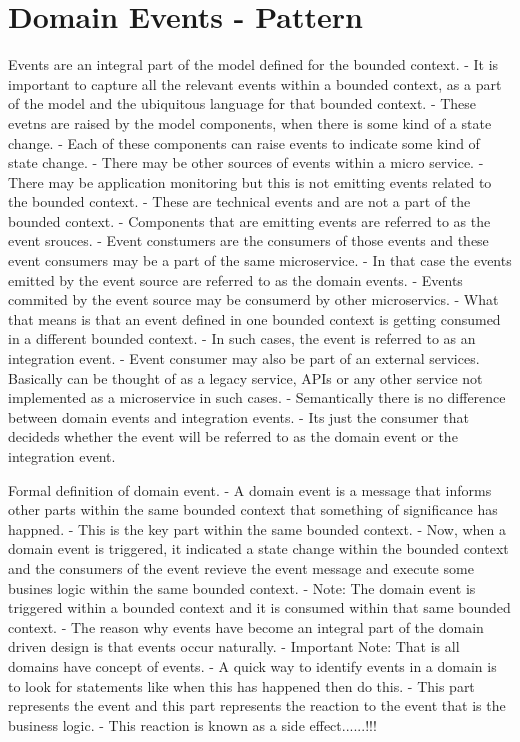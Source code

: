 \documentclass[a4paper, 11pt]{book}
\begin{document}
{    \section{Domain Events - Pattern}
    Events are an integral part of the model defined for the bounded context.
    - It is important to capture all the relevant events within a bounded context, as a part of the model and the ubiquitous language for that bounded context.
    - These evetns are raised by the model components, when there is some kind of a state change.
    - Each of these components can raise events to indicate some kind of state change.
    - There may be other sources of events within a micro service.
        - There may be application monitoring but this is not emitting events related to the bounded context.
        - These are technical events and are not a part of the bounded context.
    - Components that are emitting events are referred to as the event srouces.
    - Event constumers are the consumers of those events and these event consumers may be a part of the same microservice.
        - In that case the events emitted by the event source are referred to as the domain events.
        - Events commited by the event source may be consumerd by other microservics.
        - What that means is that an event defined in one bounded context is getting consumed in a different bounded context.
        - In such cases, the event is referred to as an integration event.
        - Event consumer may also be part of an external services. Basically can be thought of as a legacy service, APIs or any other service not implemented as a microservice in such cases.
        - Semantically there is no difference between domain events and integration events.
        - Its just the consumer that decideds whether the event will be referred to as the domain event or the integration event.

    Formal definition of domain event.
    - A domain event is a message that informs other parts within the same bounded context that something of significance has happned.
    - This is the key part within the same bounded context.
    - Now, when a domain event is triggered, it indicated a state change within the bounded context and the consumers of the event revieve the event message and execute some busines logic within the same bounded context.
    - Note: The domain event is triggered within a bounded context and it is consumed within that same bounded context.
    - The reason why events have become an integral part of the domain driven design is that events occur naturally.
        - Important Note: That is all domains have concept of events.
    - A quick way to identify events in a domain is to look for statements like when this has happened then do this.
    - This part represents the event and this part represents the reaction to the event that is the business logic.
    - This reaction is known as a side effect......!!!


}
\end{document}
